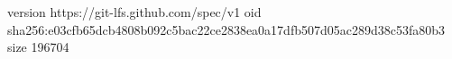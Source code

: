 version https://git-lfs.github.com/spec/v1
oid sha256:e03cfb65dcb4808b092c5bac22ce2838ea0a17dfb507d05ac289d38c53fa80b3
size 196704
